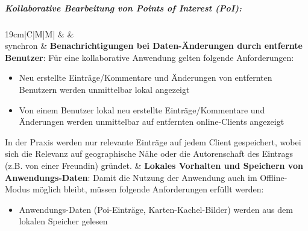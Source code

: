 \subparagraph{Kollaborative Bearbeitung von Points of Interest (PoI):}
	\begin{table}[H]
  		\begin{adjustwidth}{-1.7cm}{1.7cm}
		\centering
		\begin{tabulary}{19cm}{|C|M|M|}
			\hline
		  &  &  \\ \hline
synchron &
				\begingroup
    				\fontsize{9pt}{10pt}\selectfont
\textbf{Benachrichtigungen bei Daten-Änderungen durch entfernte Benutzer}:\newline
Für eine kollaborative Anwendung gelten folgende Anforderungen: 
\begin{itemize}[leftmargin=*,noitemsep,topsep=0ex,parsep=1pt,partopsep=0pt]
	\item Neu erstellte Einträge/Kommentare und Änderungen von entfernten Benutzern werden unmittelbar
		  lokal angezeigt
	\item Von einem Benutzer lokal neu erstellte Einträge/Kommentare und Änderungen werden unmittelbar
		  auf entfernten online-Clients angezeigt
\end{itemize}
In der Praxis werden nur relevante Einträge auf jedem Client gespeichert, wobei sich die Relevanz auf geographische Nähe oder die Autorenschaft des Eintrags (z.B. von einer Freundin) gründet.
				\endgroup
&
				\begingroup
    				\fontsize{9pt}{10pt}\selectfont
\textbf{Lokales Vorhalten und Speichern von Anwendungs-Daten}:\newline
Damit die Nutzung der Anwendung auch im Offline-Modus möglich bleibt, müssen folgende Anforderungen erfüllt werden:
\begin{itemize}[leftmargin=*,noitemsep,topsep=0ex,parsep=1pt,partopsep=0pt]
	\item Anwendungs-Daten (Poi-Einträge, Karten-Kachel-Bilder) werden aus dem lokalen Speicher gelesen

\end{itemize}
\end{tabulary}
\end{adjustwidth}
\end{table}
